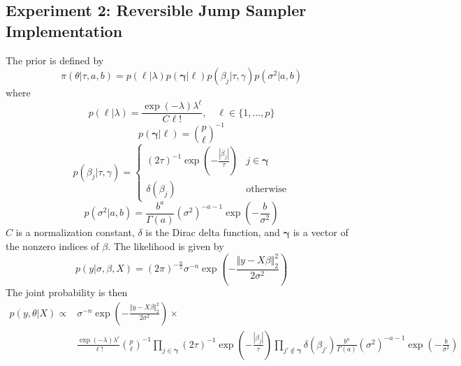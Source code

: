 \documentclass{article}
\begin{document}
\subsection{Experiment 2: Reversible Jump Sampler Implementation}
\label{appendix:ex2}
The prior is defined by
\begin{equation}
  \pi(\theta|\tau, a, b ) = p(\ell|\lambda) p(\mathbf{\gamma}|\ell) p(\beta_{j} | \tau, \gamma) p(\sigma^{2} | a, b)
\end{equation}
where
\begin{equation}
  p(\ell|\lambda) = \frac{\exp{(-\lambda)} \lambda^{\ell}}{C\ell!}, \quad \ell \in \{1,\ldots, p\}
\end{equation}
\begin{equation}
  p(\mathbf{\gamma}|\ell) = {p\choose \ell}^{-1}
\end{equation}
\begin{equation}
  p(\beta_{j} | \tau, \gamma ) = \begin{cases} (2\tau)^{-1}\exp(-\frac{|\beta_{j}|}{\tau}) & j \in \mathbf{\gamma} \\ \delta(\beta_{j}) & \text{otherwise} \end{cases}
\end{equation}
\begin{equation}
    p(\sigma^{2} | a, b) = \frac{b^{a}}{\Gamma(a)} (\sigma^{2})^{-a-1} \exp{\left(-\frac{b}{\sigma^{2}}\right)}
\end{equation}
$C$ is a normalization constant, $\delta$ is the Dirac delta function, and $\mathbf{\gamma}$ is a vector of the nonzero indices of $\beta$.
The likelihood is given by
\begin{equation}
  p(y | \sigma, \beta, X ) = (2\pi)^{-\frac{n}{2}} \sigma^{-n} \exp{\left(-\frac{\Vert y-X\beta\Vert^{2}_{2}}{2\sigma^{2}}\right)}
\end{equation}
The joint probability is then
\begin{equation}
    \begin{aligned}
         p(y, \theta | X ) \propto &\sigma^{-n} \exp{\left(-\frac{\Vert  y-X\beta\Vert^{2}_{2}}{2\sigma^{2}}\right)} \times \\ 
         & \frac{\exp{(-\lambda)} \lambda^{\ell}}{\ell!} {p\choose \ell}^{-1} \prod_{j\in \mathbf{\gamma}} (2\tau)^{-1}\exp\left(-\frac{|\beta_{j}|}{\tau}\right) \prod_{j' \notin \mathbf{\gamma}} \delta(\beta_{j'}) \frac{b^{a}}{\Gamma(a)} (\sigma^{2})^{-a-1} \exp{\left(-\frac{b}{\sigma^{2}}\right)}
    \end{aligned}
    \label{eq:ex2_joint}
\end{equation}
\end{document}
